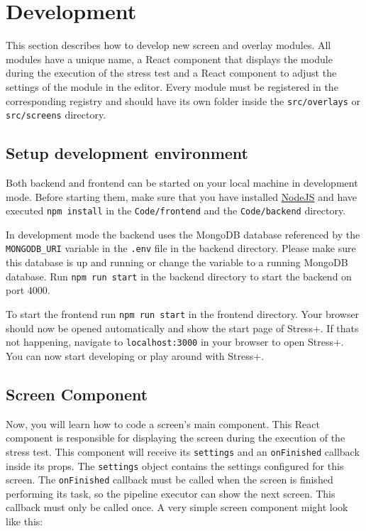 \section{Development}
\label{sec:development}

This section describes how to develop new screen and overlay modules.
All modules have a unique name, a React component that displays the module during the execution of the stress test and a React component to adjust the settings of the module in the editor. 
Every module must be registered in the corresponding registry and should have its own folder inside the \texttt{src/overlays} or \texttt{src/screens} directory.

\subsection{Setup development environment}
Both backend and frontend can be started on your local machine in development mode.
Before starting them, make sure that you have installed \href{https://nodejs.org}{NodeJS} and have executed \texttt{npm install} in the \texttt{Code/frontend} and the \texttt{Code/backend} directory.

In development mode the backend uses the MongoDB database referenced by the \texttt{MONGODB\_URI} variable in the \texttt{.env} file in the backend directory.
Please make sure this database is up and running or change the variable to a running MongoDB database.
Run \texttt{npm run start} in the backend directory to start the backend on port $4000$.

To start the frontend run \texttt{npm run start} in the frontend directory.
Your browser should now be opened automatically and show the start page of Stress+.
If thats not happening, navigate to \texttt{localhost:3000} in your browser to open Stress+.
You can now start developing or play around with Stress+.

\subsection{Screen Component}
\label{sec:development-screens}

Now, you will learn how to code a screen's main component. 
This React component is responsible for displaying the screen during the execution of the stress test.
This component will receive its \texttt{settings} and an \texttt{onFinished} callback inside its props. 
The \texttt{settings} object contains the settings configured for this screen. 
The \texttt{onFinished} callback must be called when the screen is finished performing its task, so the pipeline executor can show the next screen. 
This callback must only be called once. 
A very simple screen component might look like this:

